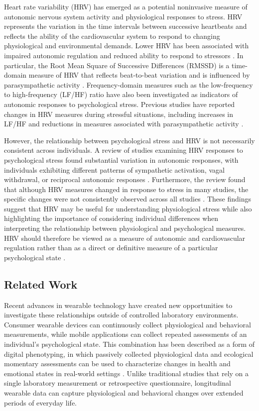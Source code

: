 \documentclass[11pt, a4paper, oneside]{article}
\begin{document}
Heart rate variability (HRV) has emerged as a potential noninvasive measure of autonomic nervous system activity and physiological responses to stress. HRV represents the variation in the time intervals between successive heartbeats and reflects the ability of the cardiovascular system to respond to changing physiological and environmental demands. Lower HRV has been associated with impaired autonomic regulation and reduced ability to respond to stressors \cite{reference 1}. In particular, the Root Mean Square of Successive Differences (RMSSD) is a time-domain measure of HRV that reflects beat-to-beat variation and is influenced by parasympathetic activity \cite{reference 1}. Frequency-domain measures such as the low-frequency to high-frequency (LF/HF) ratio have also been investigated as indicators of autonomic responses to psychological stress. Previous studies have reported changes in HRV measures during stressful situations, including increases in LF/HF and reductions in measures associated with parasympathetic activity \cite{reference 1}.

However, the relationship between psychological stress and HRV is not necessarily consistent across individuals. A review of studies examining HRV responses to psychological stress found substantial variation in autonomic responses, with individuals exhibiting different patterns of sympathetic activation, vagal withdrawal, or reciprocal autonomic responses \cite{reference 1}. Furthermore, the review found that although HRV measures changed in response to stress in many studies, the specific changes were not consistently observed across all studies \cite{reference 1}. These findings suggest that HRV may be useful for understanding physiological stress while also highlighting the importance of considering individual differences when interpreting the relationship between physiological and psychological measures. HRV should therefore be viewed as a measure of autonomic and cardiovascular regulation rather than as a direct or definitive measure of a particular psychological state \cite{reference 1}.

\subsection{Related Work}
Recent advances in wearable technology have created new opportunities to investigate these relationships outside of controlled laboratory environments. Consumer wearable devices can continuously collect physiological and behavioral measurements, while mobile applications can collect repeated assessments of an individual's psychological state. This combination has been described as a form of digital phenotyping, in which passively collected physiological data and ecological momentary assessments can be used to characterize changes in health and emotional states in real-world settings \cite{reference 2}. Unlike traditional studies that rely on a single laboratory measurement or retrospective questionnaire, longitudinal wearable data can capture physiological and behavioral changes over extended periods of everyday life.
\end{document}
